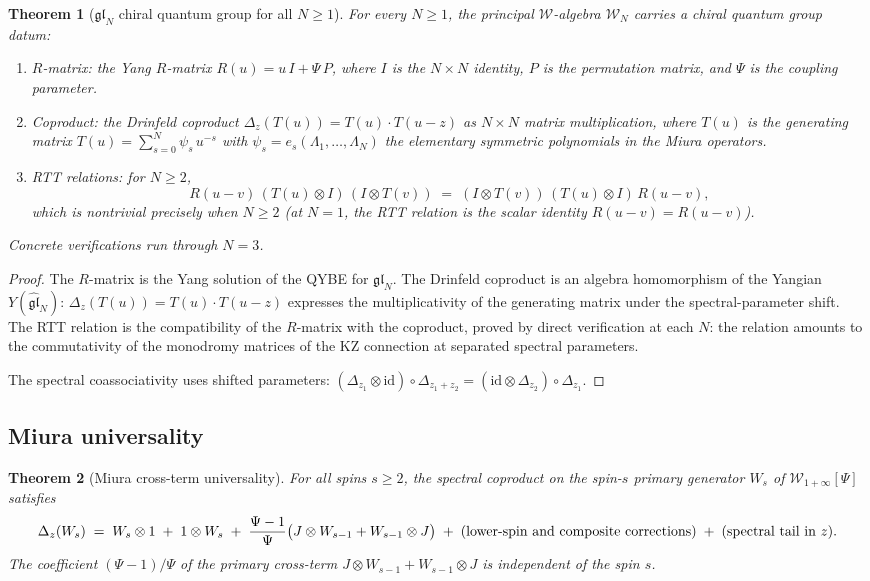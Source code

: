 \documentclass[11pt,reqno]{amsart}
\newtheorem{theorem}{Theorem}[section]
\theoremstyle{definition}
\theoremstyle{remark}
\providecommand{\cW}{\mathcal{W}}
\providecommand{\id}{\mathrm{id}}
\begin{document}
\begin{theorem}[$\mathfrak{gl}_N$ chiral quantum group for
all $N \ge 1$]
\label{thm:e-glN-chiral-qg}
For every $N \ge 1$, the principal $\cW$-algebra
$\cW_N$ carries a chiral quantum group datum:
\begin{enumerate}[label=\textup{(\Roman*)}]
\item \emph{$R$-matrix:} the Yang $R$-matrix
 $R(u) = u\,I + \Psi\,P$, where $I$ is the $N \times N$
 identity, $P$ is the permutation matrix, and $\Psi$ is the
 coupling parameter.
\item \emph{Coproduct:} the Drinfeld coproduct
 $\Delta_z(T(u)) = T(u) \cdot T(u - z)$ as $N \times N$
 matrix multiplication, where $T(u)$ is the generating matrix
 $T(u) = \sum_{s=0}^{N} \psi_s\,u^{-s}$ with
 $\psi_s = e_s(\Lambda_1,\ldots,\Lambda_N)$ the elementary
 symmetric polynomials in the Miura operators.
\item \emph{RTT relations:} for $N \ge 2$,
 \[
 R(u - v)\,(T(u) \otimes I)\,(I \otimes T(v))
 \;=\;
 (I \otimes T(v))\,(T(u) \otimes I)\,R(u - v),
 \]
 which is nontrivial precisely when $N \ge 2$
 \textup{(}at $N = 1$, the RTT relation is the scalar
 identity $R(u-v) = R(u-v)$\textup{)}.
\end{enumerate}
Concrete verifications run through $N = 3$.
\end{theorem}

\begin{proof}
The $R$-matrix is the Yang solution of the QYBE for
$\mathfrak{gl}_N$. The Drinfeld coproduct is an algebra
homomorphism of the Yangian $Y(\widehat{\mathfrak{gl}}_N)$:
$\Delta_z(T(u)) = T(u) \cdot T(u-z)$ expresses the
multiplicativity of the generating matrix under the
spectral-parameter shift. The RTT relation is the
compatibility of the $R$-matrix with the coproduct, proved
by direct verification at each $N$: the relation amounts to
the commutativity of the monodromy matrices of the KZ
connection at separated spectral parameters.

The spectral coassociativity uses shifted parameters:
$(\Delta_{z_1} \otimes \id) \circ \Delta_{z_1+z_2}
= (\id \otimes \Delta_{z_2}) \circ \Delta_{z_1}$.
\end{proof}

\subsection{Miura universality}

\begin{theorem}[Miura cross-term universality]
\label{thm:e-miura-universality}
For all spins $s \ge 2$, the spectral coproduct on the
spin-$s$ primary generator $W_s$ of
$\cW_{1+\infty}[\Psi]$ satisfies
\begin{equation}\label{eq:e-miura-cross}
\Delta_z(W_s)
\;=\;
W_s \otimes 1 \;+\; 1 \otimes W_s
\;+\;
\frac{\Psi - 1}{\Psi}
\bigl(J \otimes W_{s-1} + W_{s-1} \otimes J\bigr)
\;+\; (\textup{lower-spin and composite corrections})
\;+\; (\textup{spectral tail in $z$}).
\end{equation}
The coefficient $(\Psi - 1)/\Psi$ of the primary
cross-term $J \otimes W_{s-1} + W_{s-1} \otimes J$ is
independent of the spin $s$.
\end{theorem}
\end{document}
